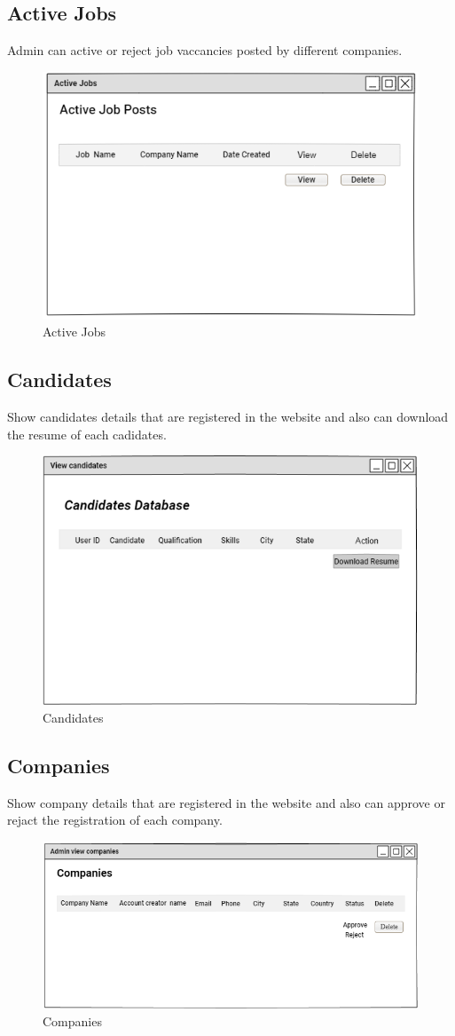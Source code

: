 \documentclass[a4paper,12pt]{report}
\begin{document}
\subsection {Active Jobs}
Admin can active or reject job vaccancies posted by different companies. 
\begin{figure}[bph]
	\centering
	\includegraphics[width=.6\linewidth]{img/admin/adminavtvejobs}
	\caption{Active Jobs}
\end{figure}

\subsection {Candidates}
Show candidates details that are registered in the website and also can download the resume of each cadidates.
\begin{figure}[bph]
	\centering
	\includegraphics[width=.6\linewidth]{img/admin/adminviewcandidts}
	\caption{Candidates}
\end{figure}
\pagebreak

\subsection {Companies}
Show company details that are registered in the website and also can approve or rejact the registration of each company.
\begin{figure}[bph]
	\centering
	\includegraphics[width=.8\linewidth]{img/admin/adminviewcmpny}
	\caption{Companies}
\end{figure}
\pagebreak
\end{document}
